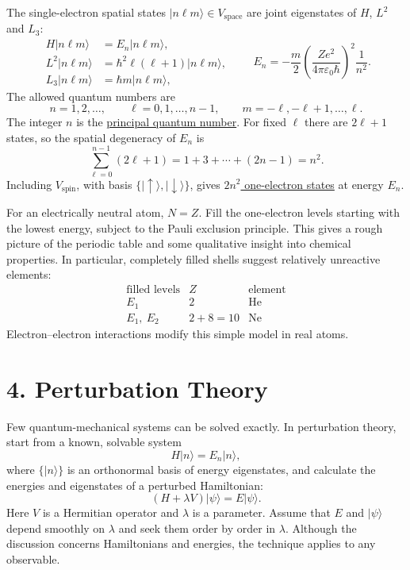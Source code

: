 \documentclass[11pt,a4paper]{article}
\begin{document}
The single-electron spatial states $|n\ell m\rangle\in V_{\mathrm{space}}$
are joint eigenstates of $H$, $L^2$ and $L_3$:
\[
    \begin{aligned}
        H|n\ell m\rangle&=E_n|n\ell m\rangle,\\
        L^2|n\ell m\rangle&=\hbar^2\ell(\ell+1)|n\ell m\rangle,\\
        L_3|n\ell m\rangle&=\hbar m|n\ell m\rangle,
    \end{aligned}
    \qquad
    E_n=-\frac{m}{2}
        \left(\frac{Ze^2}{4\pi\varepsilon_0\hbar}\right)^2
        \frac{1}{n^2}.
\]
The allowed quantum numbers are
\[
    n=1,2,\ldots,\qquad
    \ell=0,1,\ldots,n-1,\qquad
    m=-\ell,-\ell+1,\ldots,\ell.
\]
The integer $n$ is the \underline{principal quantum number}. For fixed
$\ell$ there are $2\ell+1$ states, so the spatial degeneracy of $E_n$ is
\[
    \sum_{\ell=0}^{n-1}(2\ell+1)
        =1+3+\cdots+(2n-1)=n^2.
\]
Including $V_{\mathrm{spin}}$, with basis
$\{|\uparrow\rangle,|\downarrow\rangle\}$, gives
\underline{$2n^2$ one-electron states} at energy $E_n$.

For an electrically neutral atom, $N=Z$. Fill the one-electron levels
starting with the lowest energy, subject to the Pauli exclusion
principle. This gives a rough picture of the periodic table and some
qualitative insight into chemical properties. In particular, completely
filled shells suggest relatively unreactive elements:
\[
    \begin{array}{c|c|c}
        \text{filled levels} & Z & \text{element}\\ \hline
        E_1 & 2 & \mathrm{He}\\
        E_1,\ E_2 & 2+8=10 & \mathrm{Ne}
    \end{array}
\]
Electron--electron interactions modify this simple model in real atoms.

\section*{4. Perturbation Theory}

Few quantum-mechanical systems can be solved exactly. In perturbation
theory, start from a known, solvable system
\[
    H|n\rangle=E_n|n\rangle,
\]
where $\{|n\rangle\}$ is an orthonormal basis of energy eigenstates,
and calculate the energies and eigenstates of a perturbed Hamiltonian:
\begin{equation}
    (H+\lambda V)|\psi\rangle=E|\psi\rangle.
    \tag{1}
\end{equation}
Here $V$ is a Hermitian operator and $\lambda$ is a parameter.
Assume that $E$ and $|\psi\rangle$ depend smoothly on $\lambda$ and
seek them order by order in $\lambda$. Although the discussion concerns
Hamiltonians and energies, the technique applies to any observable.
\end{document}
